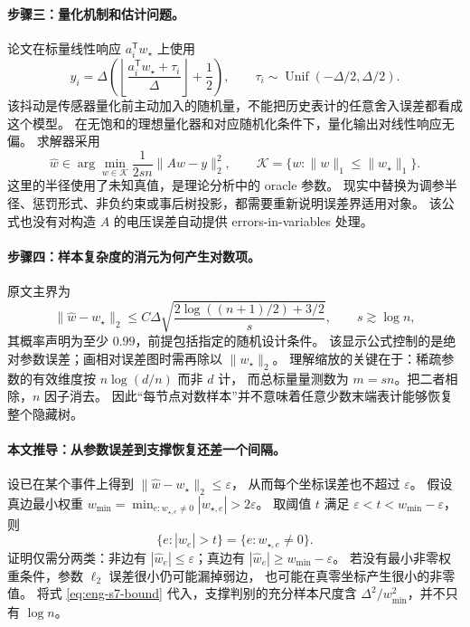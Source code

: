 \paragraph{步骤三：量化机制和估计问题。}
论文在标量线性响应 $a_i^{\mathsf T}w_\star$ 上使用
\begin{equation}
 y_i=\Delta\left(
 \left\lfloor\frac{a_i^{\mathsf T}w_\star+\tau_i}{\Delta}\right\rfloor+\frac12
 \right),\qquad
 \tau_i\sim\operatorname{Unif}(-\Delta/2,\Delta/2).
 \label{eq:eng-s7-quantizer}
\end{equation}
该抖动是传感器量化前主动加入的随机量，不能把历史表计的任意舍入误差都看成这个模型。
在无饱和的理想量化器和对应随机化条件下，量化输出对线性响应无偏。
求解器采用
\begin{equation}
 \widehat w\in\arg\min_{w\in\mathcal K}\frac1{2sn}\|Aw-y\|_2^2,
 \qquad
 \mathcal K=\{w:\|w\|_1\leq\|w_\star\|_1\}.
 \label{eq:eng-s7-lasso}
\end{equation}
这里的半径使用了未知真值，是理论分析中的 oracle 参数。
现实中替换为调参半径、惩罚形式、非负约束或事后树投影，都需要重新说明误差界适用对象。
该公式也没有对构造 $A$ 的电压误差自动提供 errors-in-variables 处理。

\paragraph{步骤四：样本复杂度的消元为何产生对数项。}
原文主界为
\begin{equation}
 \|\widehat w-w_\star\|_2
 \leq C\Delta\sqrt{
 \frac{2\log((n+1)/2)+3/2}{s}},
 \qquad s\gtrsim\log n,
 \label{eq:eng-s7-bound}
\end{equation}
其概率声明为至少 $0.99$，前提包括指定的随机设计条件。
该显示公式控制的是绝对参数误差；画相对误差图时需再除以 $\|w_\star\|_2$。
理解缩放的关键在于：稀疏参数的有效维度按 $n\log(d/n)$ 而非 $d$ 计，
而总标量量测数为 $m=sn$。把二者相除，$n$ 因子消去。
因此“每节点对数样本”并不意味着任意少数末端表计能够恢复整个隐藏树。

\paragraph{本文推导：从参数误差到支撑恢复还差一个间隔。}
设已在某个事件上得到 $\|\widehat w-w_\star\|_2\leq\varepsilon$，
从而每个坐标误差也不超过 $\varepsilon$。
假设真边最小权重
$w_{\min}=\min_{e:w_{\star,e}\neq0}|w_{\star,e}|>2\varepsilon$。
取阈值 $t$ 满足 $\varepsilon<t<w_{\min}-\varepsilon$，则
\begin{equation}
 \{e:|\widehat w_e|>t\}=\{e:w_{\star,e}\neq0\}.
 \label{eq:eng-s7-support}
\end{equation}
证明仅需分两类：非边有 $|\widehat w_e|\leq\varepsilon$；真边有
$|\widehat w_e|\geq w_{\min}-\varepsilon$。
若没有最小非零权重条件，参数 $\ell_2$ 误差很小仍可能漏掉弱边，
也可能在真零坐标产生很小的非零值。
将式 \eqref{eq:eng-s7-bound} 代入，支撑判别的充分样本尺度含
$\Delta^2/w_{\min}^2$，并不只有 $\log n$。

